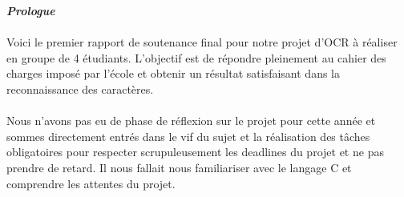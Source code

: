 \documentclass{article}
\begin{document}
\newpage
{}
\cfoot{\thepage}
\vspace*{5cm}
\begin{huge}
\hspace{-0.9cm}
\textbf{\emph{Prologue}}
\end{huge}
\vspace*{1cm}
\vspace{0.4cm}
	\paragraph{}
    Voici le premier rapport de soutenance final pour notre projet d'OCR à réaliser en groupe de 4 étudiants. L'objectif est de répondre pleinement au cahier des charges imposé par l'école et obtenir un résultat satisfaisant dans la reconnaissance des caractères.
	
	\paragraph{}
    Nous n'avons pas eu de phase de réflexion sur le projet pour cette année et sommes directement entrés dans le vif du sujet et la réalisation des tâches obligatoires pour respecter scrupuleusement les deadlines du projet et ne pas prendre de retard. Il nous fallait nous familiariser avec le langage C et comprendre les attentes du projet.
	
\end{document}
